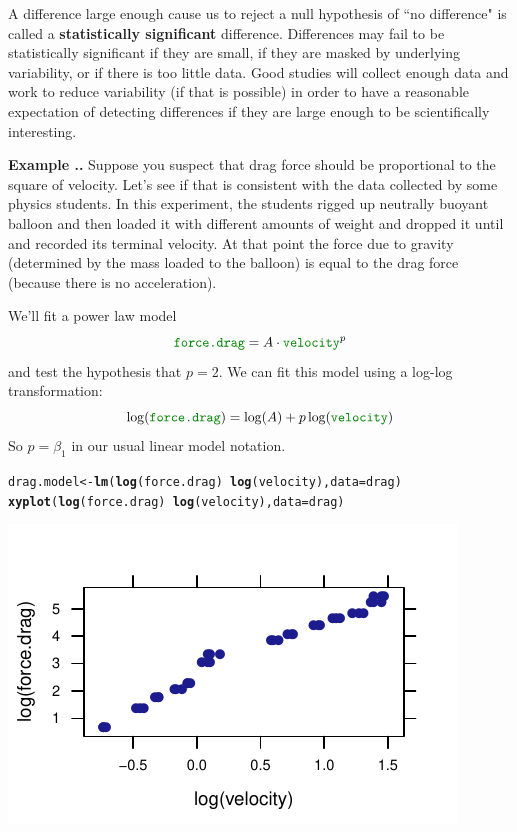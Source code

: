 \documentclass[twoside]{book}\usepackage[]{graphicx}\usepackage[]{xcolor}
\makeatletter
\def\maxwidth{ %
  \ifdim\Gin@nat@width>\linewidth
    \linewidth
  \else
    \Gin@nat@width
  \fi
}
\newcommand{\hlopt}[1]{\textcolor[rgb]{0,0,0}{#1}}%
\newcommand{\hlstd}[1]{\textcolor[rgb]{0.345,0.345,0.345}{#1}}%
\newcommand{\hlkwb}[1]{\textcolor[rgb]{0.69,0.353,0.396}{#1}}%
\newcommand{\hlkwc}[1]{\textcolor[rgb]{0.333,0.667,0.333}{#1}}%
\newcommand{\hlkwd}[1]{\textcolor[rgb]{0.737,0.353,0.396}{\textbf{#1}}}%
\newenvironment{kframe}{%
 \def\at@end@of@kframe{}%
 \ifinner\ifhmode%
  \def\at@end@of@kframe{\end{minipage}}%
  \begin{minipage}{\columnwidth}%
 \fi\fi%
 \def\FrameCommand##1{\hskip\@totalleftmargin \hskip-\fboxsep
 \colorbox{shadecolor}{##1}\hskip-\fboxsep
     \hskip-\linewidth \hskip-\@totalleftmargin \hskip\columnwidth}%
 \MakeFramed {\advance\hsize-\width
   \@totalleftmargin\z@ \linewidth\hsize
   \@setminipage}}%
 {\par\unskip\endMakeFramed%
 \at@end@of@kframe}
\newenvironment{knitrout}{}{} %
\newcommand{\variable}[1]{{\color{green!50!black}\texttt{#1}}}
\def\term#1{\textbf{#1}}
\newcounter{example}[section]
\newenvironment{example}%
{\refstepcounter{example}%
\textbf{Example \thesection.\arabic{example}. }}%
{}
\makeatother
\begin{document}
A difference large enough cause us to reject a null hypothesis of ``no difference" 
is called a \term{statistically significant} difference.  Differences may fail to be statistically
significant if they are small, if they are masked by underlying variability, or if there is too 
little data.  Good studies will collect enough data and work to reduce variability (if that is possible)
in order to have a reasonable expectation of detecting differences if they are large enough to 
be scientifically interesting.

\begin{example}
Suppose you suspect that drag force should be proportional to the square of velocity.  Let's see
if that is consistent with the data collected by some physics students.  
In this experiment, the students rigged up neutrally buoyant balloon and then loaded it 
with different amounts of weight and dropped it until and recorded its terminal velocity.
At that point the force due to gravity (determined by the mass loaded to the balloon) 
is equal to the drag force (because there is no acceleration).

We'll fit a power law model
\[
\variable{force.drag} = A \cdot \variable{velocity}^p
\]
and test the hypothesis that $p=2$.  We can fit this model using a log-log transformation:
\[
\log(\variable{force.drag}) = \log(A)  +  p \log( \variable{velocity} )
\]
So $p=\beta_1$ in our usual linear model notation.

\begin{knitrout}
\color{fgcolor}\begin{kframe}
\begin{alltt}
\hlstd{drag.model} \hlkwb{<-} \hlkwd{lm}\hlstd{(}\hlkwd{log}\hlstd{(force.drag)} \hlopt{~} \hlkwd{log}\hlstd{(velocity),} \hlkwc{data} \hlstd{= drag)}
\hlkwd{xyplot}\hlstd{(}\hlkwd{log}\hlstd{(force.drag)} \hlopt{~} \hlkwd{log}\hlstd{(velocity),} \hlkwc{data} \hlstd{= drag)}
\end{alltt}
\end{kframe}

{\centering \includegraphics[width=\maxwidth]{figures/fig-drag-again-1} 

}
\end{knitrout}
\end{example}
\end{document}

